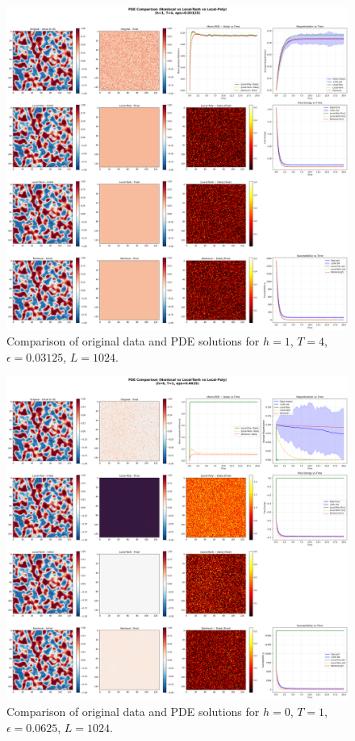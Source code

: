 \documentclass[11pt,a4paper]{article}
\begin{document}
\begin{figure}[h]
    \centering
    \includegraphics[width=1.0\textwidth]{fig/compare_pde_solvers_L1024_h1_T4_eps0.03125.png}
    \caption{Comparison of original data and PDE solutions for $h=1$, $T=4$, $\epsilon=0.03125$, $L=1024$.}
    \label{fig:pde_comparison_h1_T4_eps0.03125}
\end{figure}



\begin{figure}[!h]
    \centering
    \includegraphics[width=1.0\textwidth]{fig/compare_pde_solvers_L1024_h0_T1_eps0.0625.png}
    \caption{Comparison of original data and PDE solutions for $h=0$, $T=1$, $\epsilon=0.0625$, $L=1024$.}
    \label{fig:pde_comparison_h0_T1_eps0.0625}
\end{figure}
\end{document}
